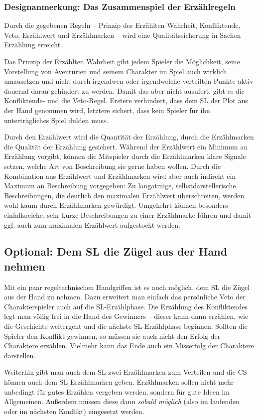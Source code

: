 \begin{design}
\subsubsection{Designanmerkung: Das Zusammenspiel der Erzählregeln}\label{DesignAnmerkungenZusammenspielErzaehlregeln}

Durch die gegebenen Regeln -- Prinzip der Erzählten Wahrheit, Konfliktende, Veto, Erzählwert und Erzählmarken -- wird eine Qualitätssicherung in Sachen Erzählung erreicht.

Das Prinzip der Erzählten Wahrheit gibt jedem Spieler die Möglichkeit, seine Vorstellung von Aventurien und seinem Charakter im Spiel auch wirklich umzusetzen und nicht durch irgendwen oder irgendwelche verteilten Punkte aktiv dauernd daran gehindert zu werden. Damit das aber nicht ausufert, gibt es die Konfliktende- und die Veto-Regel. Erstere verhindert, dass dem SL der Plot aus der Hand genommen wird, letztere sichert, dass kein Spieler für ihn unterträgliches Spiel dulden muss.

Durch den Erzählwert wird die Quantität der Erzählung, durch die Erzählmarken die Qualität der Erzählung gesichert. Während der Erzählwert ein Minimum an Erzählung vorgibt, können die Mitspieler durch die Erzählmarken klare Signale setzen, welche Art von Beschreibung sie gerne haben wollen. Durch die Kombination aus Erzählwert und Erzählmarken wird aber auch indirekt ein Maximum an Beschreibung vorgegeben: Zu langatmige, selbstdarstellerische Beschreibungen, die deutlich den maximalen Erzählwert überschreiten, werden wohl kaum durch Erzählmarken gewürdigt. Umgekehrt können besonders einfallsreiche, sehr kurze Beschreibungen zu einer Erzählmarke führen und damit ggf. auch zum maximalen Erzählwert aufgestockt werden.
\end{design}

\begin{optional}
\section{Optional: Dem SL die Zügel aus der Hand nehmen}\label{Optional:ZuegelAusDerHand1}

Mit ein paar regeltechnischen Handgriffen ist es auch möglich, dem SL die Zügel aus der Hand zu nehmen. Dazu erweitert man einfach das persönliche Veto der Charakterspieler auch auf die SL-Erzählphase. Die Erzählung des Konfliktendes legt man völlig frei in die Hand des Gewinners -- dieser kann dann erzählen, wie die Geschichte weitergeht und die nächste SL-Erzählphase beginnen. Sollten die Spieler den Konflikt gewinnen, so müssen sie auch nicht den Erfolg der Charaktere erzählen. Vielmehr kann das Ende auch ein Misserfolg der Charaktere darstellen.

Weiterhin gibt man auch dem SL zwei Erzählmarken zum Verteilen und die CS können auch dem SL Erzählmarken geben. Erzählmarken sollen nicht mehr unbedingt für gutes Erzählen vergeben werden, sondern für gute Ideen im Allgemeinen. Außerdem müssen diese dann \emph{sobald möglich} (also im laufenden oder im nächsten Konflikt) eingesetzt werden.
\end{optional}


